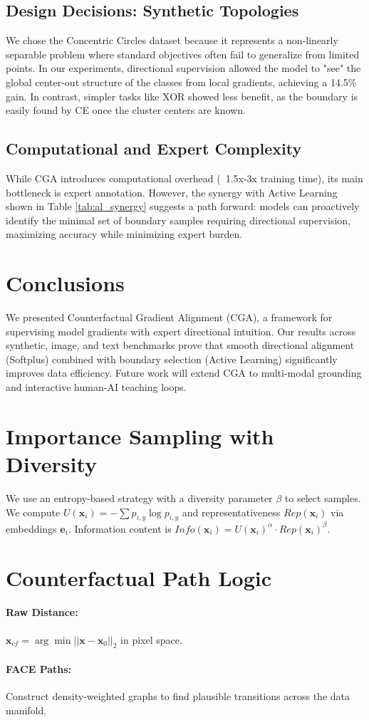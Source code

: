\documentclass[sigconf,anonymous]{aamas}
\begin{document}
\subsection{Design Decisions: Synthetic Topologies}
We chose the Concentric Circles dataset because it represents a non-linearly separable problem where standard objectives often fail to generalize from limited points. In our experiments, directional supervision allowed the model to "see" the global center-out structure of the classes from local gradients, achieving a 14.5\% gain. In contrast, simpler tasks like XOR showed less benefit, as the boundary is easily found by CE once the cluster centers are known.

\subsection{Computational and Expert Complexity}
While CGA introduces computational overhead (~1.5x-3x training time), its main bottleneck is expert annotation. However, the synergy with Active Learning shown in Table \ref{tab:al_synergy} suggests a path forward: models can proactively identify the minimal set of boundary samples requiring directional supervision, maximizing accuracy while minimizing expert burden.

\section{Conclusions}
We presented Counterfactual Gradient Alignment (CGA), a framework for supervising model gradients with expert directional intuition. Our results across synthetic, image, and text benchmarks prove that smooth directional alignment (Softplus) combined with boundary selection (Active Learning) significantly improves data efficiency. Future work will extend CGA to multi-modal grounding and interactive human-AI teaching loops.

\balance



\appendix
\section{Importance Sampling with Diversity}
\label{appendix:al}
We use an entropy-based strategy with a diversity parameter $\beta$ to select samples. We compute $U(\mathbf{x}_i) = -∑ p_{i,y} \log p_{i,y}$ and representativeness $Rep(\mathbf{x}_i)$ via embeddings $\mathbf{e}_i$. Information content is $Info(\mathbf{x}_i) = U(\mathbf{x}_i)^\alpha \cdot Rep(\mathbf{x}_i)^\beta$.

\section{Counterfactual Path Logic}
\paragraph{Raw Distance:} $\mathbf{x}_{cf} = \arg\min ||\mathbf{x} - \mathbf{x}_0||_2$ in pixel space.
\paragraph{FACE Paths:} Construct density-weighted graphs to find plausible transitions across the data manifold.
\end{document}
